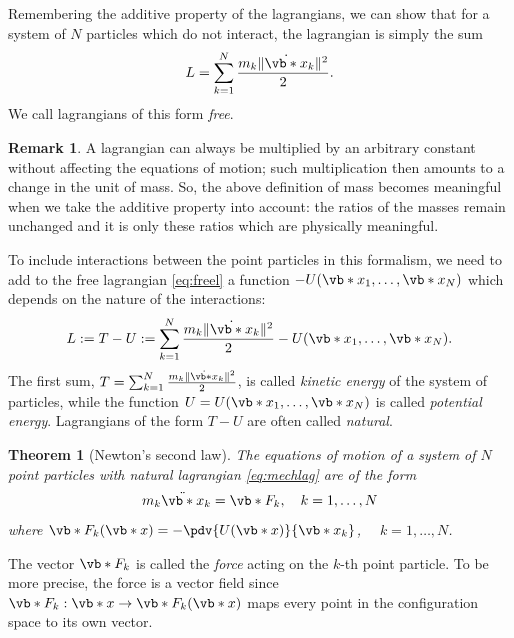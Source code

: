 \documentclass[english,fontsize=11pt,paper=b5]{scrbook}
\newtheorem{theorem}{Theorem}[chapter]
\theoremstyle{definition}
\newtheorem{remark}{Remark}[chapter]
\newcommand{\emphidx}[1]{\index{#1}\emph{#1}}
\begin{document}
    Remembering the additive property of the lagrangians, we can show that for a system of $N$ particles which do not interact, the lagrangian is simply the sum
    \begin{equation}\label{eq:freel}
      L = \sum_{k=1}^N \frac{m_k \|\dot{\vb*{x}}_k\|^2}{2}.
    \end{equation}
    We call lagrangians of this form \emph{free}.

    \begin{remark}
      A lagrangian can always be multiplied by an arbitrary constant without affecting the equations of motion;
      such multiplication then amounts to a change in the unit of mass.
       So, the above definition of mass becomes meaningful when we take the additive property into account:
      the ratios of the masses remain unchanged and it is only these ratios which are physically meaningful.
    \end{remark}

    To include interactions between the point particles in this formalism, we need to add to the free lagrangian \eqref{eq:freel} a function $-U(\vb*{x}_1, \ldots, \vb*{x}_N)$ which depends on the nature of the interactions:
    \begin{equation}\label{eq:mechlag}
      L := T-U := \sum_{k=1}^N \frac{m_k \|\dot{\vb*{x}}_k\|^2}{2} -U(\vb*{x}_1, \ldots, \vb*{x}_N).
    \end{equation}
    The first sum, $T = \sum_{k=1}^N \frac{m_k \|\dot{\vb*{x}}_k\|^2}{2}$, is called \emph{kinetic energy} of the system of particles, while the function $U = U(\vb*{x}_1, \ldots, \vb*{x}_N)$ is called \emph{potential energy}.
    Lagrangians of the form $T-U$ are often called \emph{natural}.

    \begin{theorem}[Newton's second law]
      The equations of motion of a system of $N$ point particles with natural lagrangian \eqref{eq:mechlag} are of the form
      \begin{equation}\label{eq:newton2}
        m_k \ddot{\vb*{x}}_k = \vb*{F}_k, \quad k=1,\ldots,N
      \end{equation}
      where $\vb*{F}_k (\vb*{x}) = -\pdv{U (\vb*{x})}{\vb*{x}_k}$, $\quad k=1,\ldots,N$.
    \end{theorem}

    The vector $\vb*{F}_k$ is called the \emphidx{force} acting on the $k$-th point particle. To be more precise, the force is a vector field since $\vb*{F}_k : \vb*{x} \to \vb*{F}_k(\vb*{x})$ maps every point in the configuration space to its own vector.
\end{document}

